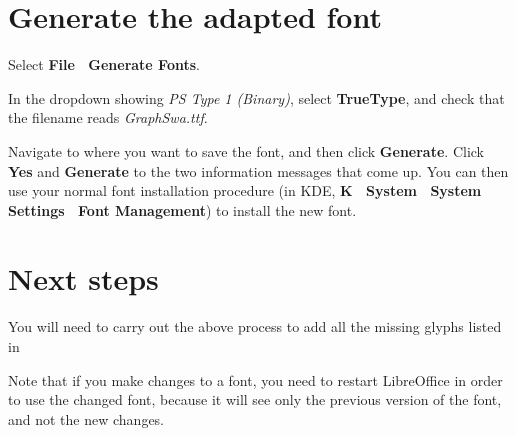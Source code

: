 \section{Generate the adapted font}

Select \textbf{File \textrightarrow\ Generate Fonts}.

In the dropdown showing \textit{PS Type 1 (Binary)}, select \textbf{TrueType}, and check that the filename reads \textit{GraphSwa.ttf}.

Navigate to where you want to save the font, and then click \textbf{Generate}.  Click \textbf{Yes} and \textbf{Generate} to the two information messages that come up.  You can then use your normal font installation procedure (in KDE, \textbf{K \textrightarrow\ System \textrightarrow\ System Settings \textrightarrow\ Font Management}) to install the new font.

\section{Next steps}

You will need to carry out the above process to add all the missing glyphs listed in 

Note that if you make changes to a font, you need to restart LibreOffice in order to use the changed font, because it will see only the previous version of the font, and not the new changes.
